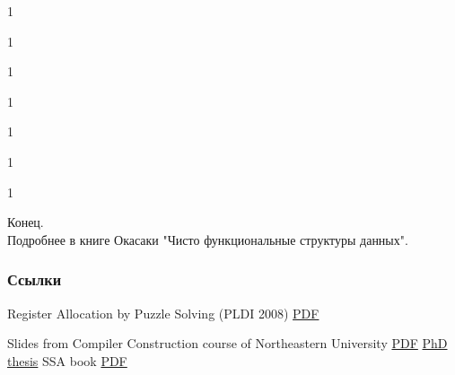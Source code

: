 \documentclass[aspectratio=169
  , xcolor={svgnames}
  , hyperref={ colorlinks,citecolor=DeepPink4
             , linkcolor=DarkRed,urlcolor=DarkBlue}
  , russian
  ]{beamer}
\theoremstyle{exerciseStyle1}
\begin{document}
\begin{frame}[fragile]{}
1
\end{frame}

\begin{frame}[fragile]{}
1
\end{frame}

\begin{frame}[fragile]{}
1
\end{frame}

\begin{frame}[fragile]{}
1
\end{frame}

\begin{frame}[fragile]{}
1
\end{frame}

\begin{frame}[fragile]{}
1
\end{frame}

\begin{frame}[fragile]{}
1
\end{frame}

%
%
%
%
%


\begin{frame}
\begin{center}
  {\Huge Конец.}\\
  
  Подробнее в книге Окасаки "Чисто функциональные структуры данных".
\end{center}
\end{frame}


 \begin{frame}[allowframebreaks]
   \frametitle<presentation>{Ссылки}
   \begin{thebibliography}{10}
     Register Allocation by Puzzle Solving (PLDI 2008)
     \newblock \href{http://conal.net/papers/compiling-to-categories/compiling-to-categories.pdf}{PDF}
           
     Slides from Compiler Construction course of Northeastern University
     \newblock \href{https://users.cs.northwestern.edu/~robby/courses/322-2016-spring/puzzle_solving.pdf}{PDF}
     \href{http://compilers.cs.ucla.edu/fernando/publications/papers/PhdDiss.pdf}{PhD thesis}
      SSA book
     \href{http://ssabook.gforge.inria.fr/latest/book.pdf}{PDF} 
   \end{thebibliography}
 \end{frame}
\end{document}
